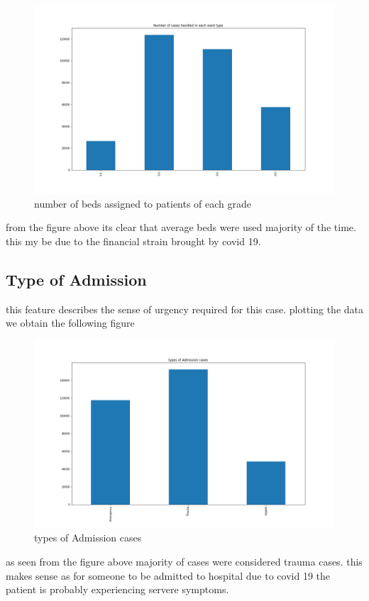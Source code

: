 \documentclass[fleqn]{article}
\begin{document}
			 \begin{figure}[hb]
  				\includegraphics[width=\linewidth]{bed_hist.png}
  				\caption{number of beds assigned to patients of each grade}
  				\label{fig:6}
			\end{figure} 
			\FloatBarrier	
			
			from the figure above its clear that average beds were used majority of 				the time. this my be due to the financial strain brought by covid 19.
			
			
		\subsection*{Type of Admission}
			this feature describes the sense of urgency required for this case. 					plotting the data we obtain the following figure
			
			\begin{figure}[hb]
  				\includegraphics[width=\linewidth]{admin_hist.png}
  				\caption{types of Admission cases}
  				\label{fig:6}
			\end{figure} 
			\FloatBarrier
			
			as seen from the figure above majority of cases were considered trauma 					cases. this makes sense as for someone to be admitted to hospital due to 			covid 19 the patient is probably experiencing servere symptoms.
\end{document}

